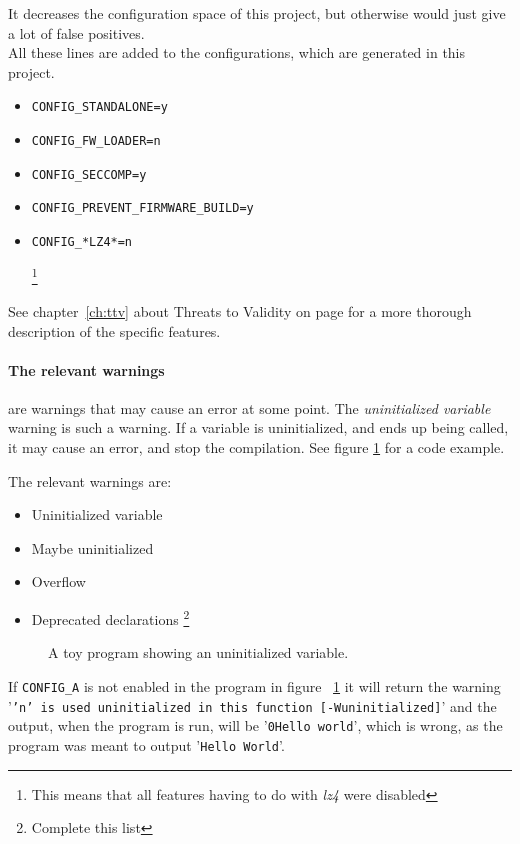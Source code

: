 \documentclass[a4paper,11pt]{report}
\newcommand{\textcode}[1]{
    \fboxsep=1pt
    \texttt{\colorbox{gray!20}{#1}}
}
\newcommand{\figa}{
    \begin{figure}[!htpb]
    \centering
}
\newcommand{\figb}[2]{
    \caption{#1}
    \label{#2}
    \end{figure}
}
\begin{document}
It decreases the configuration space of this project, but otherwise 
would just give a lot of false positives.
\\

All these lines are added to the configurations, which are generated in
this project.

\begin{itemize}
    \item \textcode{CONFIG\_STANDALONE=y}
    \item \textcode{CONFIG\_FW\_LOADER=n}
    \item \textcode{CONFIG\_SECCOMP=y}
    \item \textcode{CONFIG\_PREVENT\_FIRMWARE\_BUILD=y}
    \item \textcode{CONFIG\_*LZ4*=n}
        \footnote{This means that all features having to do with \emph{lz4} 
                    were disabled}
\end{itemize}

See chapter~\ref{ch:ttv} about Threats to Validity on page \pageref{ch:ttv} 
for a more thorough description of the specific features.


    \paragraph{The relevant warnings}
are warnings that may cause an error at some point. The \emph{uninitialized 
variable} warning is such a warning. If a variable is uninitialized, and ends 
up being called, it may cause an error, and stop the compilation. See figure 
\ref{lst:uninitvar} for a code example.

The relevant warnings are:

\begin{itemize}
    \item Uninitialized variable
    \item Maybe uninitialized
    \item Overflow
    \item Deprecated declarations
        \footnote{Complete this list}
\end{itemize}

\figa
    
\figb{A toy program showing an uninitialized variable.}{lst:uninitvar}

If \textcode{CONFIG\_A} is not enabled in the program in figure 
~\ref{lst:uninitvar} it will return the warning 
'\texttt{'n' is used uninitialized in this function [-Wuninitialized]}' and the 
output, when the program is run, will be '\texttt{0Hello world}',
which is wrong, as the program was meant to output '\texttt{Hello World}'.
\end{document}
